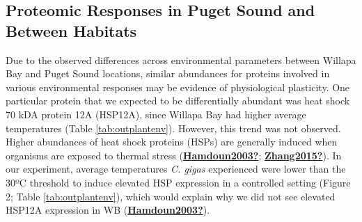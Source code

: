 \documentclass [11pt, proquest] {uwthesis}[2015/03/03]
\begin{document}
\hypertarget{proteomic-responses-in-puget-sound-and-between-habitats}{%
\subsection{Proteomic Responses in Puget Sound and Between Habitats}\label{proteomic-responses-in-puget-sound-and-between-habitats}}

Due to the observed differences across environmental parameters between Willapa Bay and Puget Sound locations, similar abundances for proteins involved in various environmental responses may be evidence of physiological plasticity. One particular protein that we expected to be differentially abundant was heat shock 70 kDA protein 12A (HSP12A), since Willapa Bay had higher average temperatures (Table \ref{tab:outplantenv}). However, this trend was not observed. Higher abundances of heat shock proteins (HSPs) are generally induced when organisms are exposed to thermal stress (\protect\hyperlink{ref-Hamdoun2003}{\textbf{Hamdoun2003?}}; \protect\hyperlink{ref-Zhang2015}{\textbf{Zhang2015?}}). In our experiment, average temperatures \emph{C. gigas} experienced were lower than the 30ºC threshold to induce elevated HSP expression in a controlled setting (Figure 2; Table \ref{tab:outplantenv}), which would explain why we did not see elevated HSP12A expression in WB (\protect\hyperlink{ref-Hamdoun2003}{\textbf{Hamdoun2003?}}).
\end{document}
